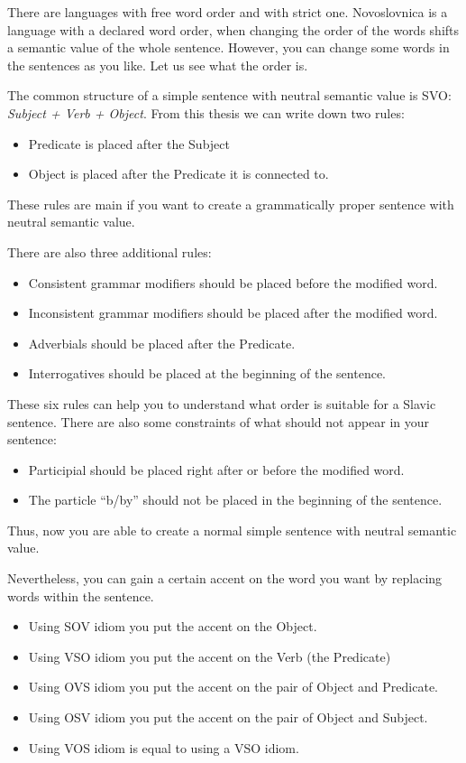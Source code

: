 There are languages with free word order and with strict one. Novoslovnica is a language with a declared word order, when changing the order of the words shifts a semantic value of the whole sentence. However, you can change some words in the sentences as you like. Let us see what the order is.

The common structure of a simple sentence with neutral semantic value is SVO: \textit{Subject + Verb + Object}. From this thesis we can write down two rules:

\begin{itemize}
	\item Predicate is placed after the Subject
	\item Object is placed after the Predicate it is connected to.
\end{itemize}

These rules are main if you want to create a grammatically proper sentence with neutral semantic value. 

There are also three additional rules:

\begin{itemize}
	\item Consistent grammar modifiers should be placed before the modified word.
	\item Inconsistent grammar modifiers should be placed after the modified word.
	\item Adverbials should be placed after the Predicate.
	\item Interrogatives should be placed at the beginning of the sentence.
\end{itemize}

These six rules can help you to understand what order is suitable for a Slavic sentence. There are also some constraints of what should not appear in your sentence:

\begin{itemize}
	\item Participial should be placed right after or before the modified word.
	\item The particle “b/by” should not be placed in the beginning of the sentence.
\end{itemize}

Thus, now you are able to create a normal simple sentence with neutral semantic value.

Nevertheless, you can gain a certain accent on the word you want by replacing words within the sentence.

\begin{itemize}
	\item Using SOV idiom you put the accent on the Object.
	\item Using VSO idiom you put the accent on the Verb (the Predicate)
	\item Using OVS idiom you put the accent on the pair of Object and Predicate.
	\item Using OSV idiom you put the accent on the pair of Object and Subject.
	\item Using VOS idiom is equal to using a VSO idiom.
\end{itemize}

